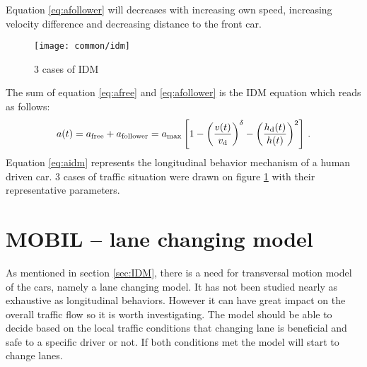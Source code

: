 		Equation \ref{eq:afollower} will decreases with increasing own speed, increasing velocity difference and decreasing distance to the front car.
		\begin{figure}
			\centering
			\texttt{[image: common/idm]}
			\caption{3 cases of IDM}
			\label{fig:idm}
		\end{figure}
		The sum of equation \ref{eq:afree} and \ref{eq:afollower} is the IDM equation which reads as follows:
		\begin{equation}
			a(t)=a_{\rm free}+a_{\rm follower}=a_{\rm max}\left [ 1 - \left ( \frac{v(t)}{{v_{\rm d}}} \right )^{\delta} - \left ( \frac{h_{\rm d}(t)}{h(t)} \right )^2 \right ]\,.
			\label{eq:aidm}
		\end{equation}
		Equation \ref{eq:aidm} represents the longitudinal behavior mechanism of a human driven car. 3 cases of traffic situation were drawn on figure \ref{fig:idm} with their representative parameters.
	\section{MOBIL -- lane changing model} \label{sec:MOBIL}
		As mentioned in section \ref{sec:IDM}, there is a need for transversal motion model of the cars, namely a lane changing model. It has not been studied nearly as exhaustive as longitudinal behaviors. However it can have great impact on the overall traffic flow so it is worth investigating. The model should be able to decide based on the local traffic conditions that changing lane is beneficial and safe to a specific driver or not. If both conditions met the model will start to change lanes.

